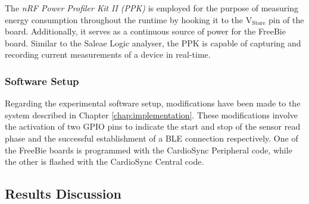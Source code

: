 \noindent The \textit{nRF Power Profiler Kit II (PPK)} \cite{2023Power} is employed for the purpose of measuring energy consumption throughout the runtime by hooking it to the \(\text{V}_\text{Store}\) pin of the board. Additionally, it serves as a continuous source of power for the FreeBie board. Similar to the Saleae Logic analyser, the PPK is capable of capturing and recording current measurements of a device in real-time.

\subsubsection{Software Setup}
Regarding the experimental software setup, modifications have been made to the system described in Chapter \ref{chap:implementation}. These modifications involve the activation of two GPIO pins to indicate the start and stop of the sensor read phase and the successful establishment of a BLE connection respectively. One of the FreeBie boards is programmed with the CardioSync Peripheral code, while the other is flashed with the CardioSync Central code.

\subsection{Results Discussion}

